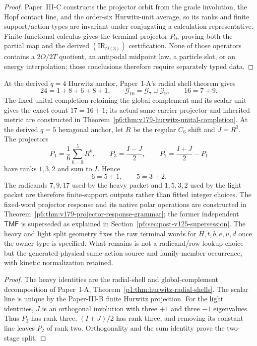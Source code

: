\documentclass[12pt,a4paper]{article}
\begin{document}
\begin{proof}
Paper~III-C constructs the projector orbit from the grade involution, the
Hopf contact line, and the order-six Hurwitz-unit average, so its ranks and
finite support/action types are invariant under conjugating a calculation
representative.
Finite functional calculus gives the terminal projector \(P_0\), proving both
the partial map and the derived \((\mathrm{IR}_{O(3)})\) certification.  None
of those operators contains a
\(2O/2T\) quotient, an antipodal midpoint law, a particle slot, or an energy
interpolation; those conclusions therefore require separately typed data.
\end{proof}

\begin{theorem}
\label{p6:thm:derived-anchor-split-grammars}
At the derived \(q=4\) Hurwitz anchor, Paper~I-A's radial shell theorem gives
\[
 24=1+8+6+8+1,
 \qquad
 \mathcal G_{16}=\mathcal G_7\sqcup\mathcal G_9,
 \qquad
 \boxed{16=7+9}.
\]
The fixed unital completion retaining the global complement and its
scalar unit gives the exact count \(17=16+1\); its actual same-carrier
projector and inherited metric are constructed in
Theorem~\ref{p6:thm:v179-hurwitz-unital-completion}.  At the derived \(q=5\) hexagonal anchor, let \(R\) be the
regular \(C_6\) shift and \(J=R^3\).  The projectors
\[
 P_1=\frac16\sum_{k=0}^{5}R^k,
 \qquad P_3=\frac{I-J}{2},
 \qquad P_2=\frac{I+J}{2}-P_1
\]
have ranks \(1,3,2\) and sum to \(I\).  Hence
\[
 \boxed{6=5+1,\qquad5=3+2}.
\]
The radicands \(7,9,17\) used by the heavy packet and \(1,5,3,2\) used by
the light packet are therefore finite-support outputs rather than fitted
integer choices.  The fixed-word projector response and its native polar
operations are constructed in
Theorem~\ref{p6:thm:v179-projector-response-grammar}; the former
independent \(\mathsf{TMF}\) is superseded as explained in
Section~\ref{p6:sec:post-v125-supersession}.
The heavy and light split geometry fixes the raw terminal words for
\(H,t,b,e,u,d\) once the owner type is specified.  What remains is not a
radicand/row lookup choice but the generated physical same-action source and
family-member occurrence, with kinetic normalization retained.
\end{theorem}

\begin{proof}
The heavy identities are the radial-shell and global-complement decomposition
of Paper~I-A, Theorem~\ref{p1:thm:hurwitz-radial-shells}.  The scalar line is
unique by the Paper-III-B finite Hurwitz projection.  For the light identities,
\(J\) is an orthogonal involution with three \(+1\) and three \(-1\)
eigenvalues.  Thus \(P_3\) has rank three, \((I+J)/2\) has rank three, and
removing its constant line leaves \(P_2\) of rank two.  Orthogonality and the
sum identity prove the two-stage split.
\end{proof}
\end{document}
